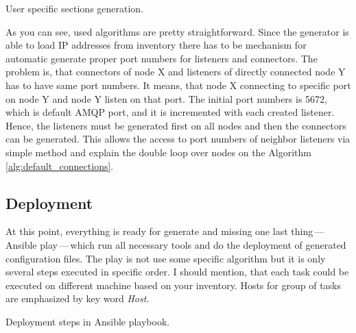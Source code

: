 \begin{description}
	\begin{center}
		\begin{algorithm}[H]
			 \caption{User specific sections generation.}
			 \label{alg:user_specific_sections}
		\end{algorithm}
	\end{center}

\end{description}

As you can see, used algorithms are pretty straightforward. Since the generator is able to load IP addresses from inventory there has to be mechanism for automatic generate proper port numbers for listeners and connectors. The problem is, that connectors of node X and listeners of directly connected node Y has to have same port numbers. It means, that node X connecting to specific port on node Y and node Y listen on that port. The initial port numbers is 5672, which is default AMQP port, and it is incremented with each created listener. Hence, the listeners must be generated first on all nodes and then the connectors can be generated. This allows the access to port numbers of neighbor listeners via simple method and explain the double loop over nodes on the Algorithm \ref{alg:default_connections}.


\subsection{Deployment}
At this point, everything is ready for generate and missing one last thing\,---\,Ansible play\,---\,which run all necessary tools and do the deployment of generated configuration files. The play is not use some specific algorithm but it is only several steps executed in specific order. I should mention, that each task could be executed on different machine based on your inventory. Hosts for group of tasks are emphasized by key word \emph{Host}.

\begin{center}
	\begin{algorithm}[H]


		\;

		\;

		 \caption{Deployment steps in Ansible playbook.}
		 \label{alg:ansible_deployment}
	\end{algorithm}
\end{center}

